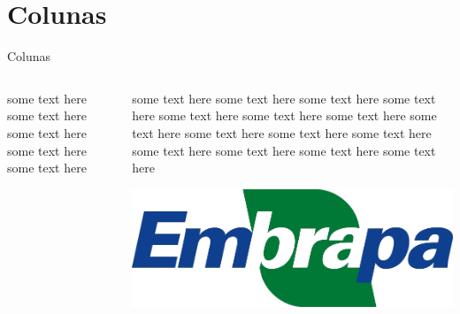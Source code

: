 \documentclass[aspectratio=1610]{beamer}
\begin{document}
	\section{Colunas}
	
	\begin{frame}{Colunas}
	
	\begin{columns}
		
		\begin{column}{0.5\textwidth}
			some text here some text here some text here some text here some text here
		\end{column}
	
		\begin{column}{0.5\textwidth}  %
			some text here some text here some text here some text here some text here
			some text here some text here some text here some text here some text here
			some text here some text here some text here some text here some text here
			\begin{center}
				\includegraphics[width=1\textwidth]{fig/embrapa.png}
			\end{center}
		\end{column}
	
	\end{columns}
	
	\end{frame}
\end{document}
